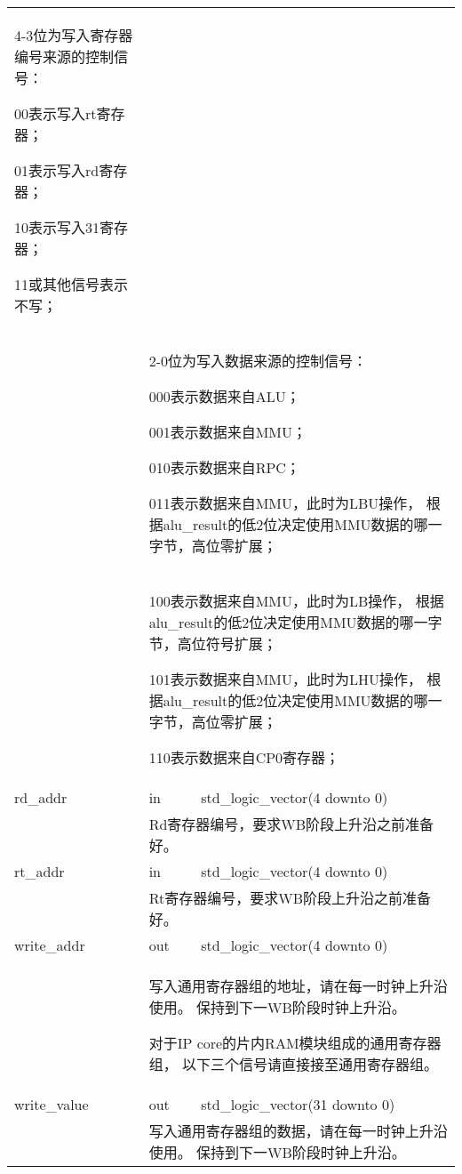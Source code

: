 \begin{tabularx}{\textwidth}{lll}
{                4-3位为写入寄存器编号来源的控制信号：

                    00表示写入rt寄存器；

                    01表示写入rd寄存器；

                    10表示写入31寄存器；

                    11或其他信号表示不写；
            } \\
            &
            \multicolumn{2}{X}{
                2-0位为写入数据来源的控制信号：

                    000表示数据来自ALU；

                    001表示数据来自MMU；

                    010表示数据来自RPC；

                    011表示数据来自MMU，此时为LBU操作，%
                    根据alu\_result的低2位决定使用MMU数据的哪一字节，高位零扩展；
            } \\
            &
            \multicolumn{2}{X}{
                    100表示数据来自MMU，此时为LB操作，%
                    根据alu\_result的低2位决定使用MMU数据的哪一字节，高位符号扩展；

                    101表示数据来自MMU，此时为LHU操作，%
                    根据alu\_result的低2位决定使用MMU数据的哪一字节，高位零扩展；

                    110表示数据来自CP0寄存器；
            } \\
            \midrule
            rd\_addr        & in    & std\_logic\_vector(4 downto 0) \\
            \cmidrule(l){2-3}
            &
            \multicolumn{2}{X}{
                Rd寄存器编号，要求WB阶段上升沿之前准备好。
            } \\
            \midrule
            rt\_addr        & in    & std\_logic\_vector(4 downto 0) \\
            \cmidrule(l){2-3}
            &
            \multicolumn{2}{X}{
                Rt寄存器编号，要求WB阶段上升沿之前准备好。
            } \\
            \midrule
            write\_addr     & out   & std\_logic\_vector(4 downto 0) \\
            \cmidrule(l){2-3}
            &
            \multicolumn{2}{X}{
                写入通用寄存器组的地址，请在每一时钟上升沿使用。%
                保持到下一WB阶段时钟上升沿。

                对于IP core的片内RAM模块组成的通用寄存器组，%
                以下三个信号请直接接至通用寄存器组。
            } \\
            \midrule
            write\_value    & out   & std\_logic\_vector(31 downto 0) \\
            \cmidrule(l){2-3}
            &
            \multicolumn{2}{X}{
                写入通用寄存器组的数据，请在每一时钟上升沿使用。%
                保持到下一WB阶段时钟上升沿。

}
\end{tabularx}
